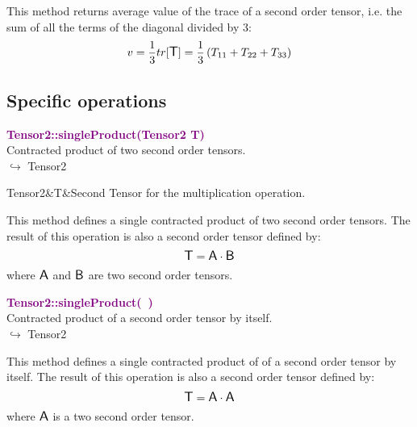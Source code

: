 This method returns average value of the trace of a second order tensor, i.e. the sum of all the terms of the diagonal divided by 3:
\begin{equation*}
v = \frac{1}{3} tr[\mbox{\large\ensuremath{\mathsf{T}}}] =  \frac{1}{3} \left( T_{11}+T_{22}+T_{33} \right)
\end{equation*}

\subsection{Specific operations}

\textcolor{purple}{\textbf{Tensor2::singleProduct(Tensor2 T)}}\label{Tensor2::singleProduct(Tensor2 T)}\\
Contracted product of two second order tensors.\\ \hspace*{10mm}$\hookrightarrow$ Tensor2

\begin{tcolorbox}[width=\textwidth,myArgs,tabularx={ll|R},title=Arguments of Tensor2::singleProduct]
Tensor2&T&Second Tensor for the multiplication operation.
\end{tcolorbox}

This method defines a single contracted product of two second order tensors.
The result of this operation is also a second order tensor defined by:
\begin{equation*}
\mbox{\large\ensuremath{\mathsf{T}}} = \mbox{\large\ensuremath{\mathsf{A}}} \cdot \mbox{\large\ensuremath{\mathsf{B}}}
\end{equation*}
where $\mbox{\large\ensuremath{\mathsf{A}}}$ and $\mbox{\large\ensuremath{\mathsf{B}}}$ are two second order tensors.

\textcolor{purple}{\textbf{Tensor2::singleProduct(~)}}\label{Tensor2::singleProduct()}\\
Contracted product of a second order tensor by itself.\\ \hspace*{10mm}$\hookrightarrow$ Tensor2

This method defines a single contracted product of of a second order tensor by itself.
The result of this operation is also a second order tensor defined by:
\begin{equation*}
\mbox{\large\ensuremath{\mathsf{T}}} = \mbox{\large\ensuremath{\mathsf{A}}} \cdot \mbox{\large\ensuremath{\mathsf{A}}}
\end{equation*}
where $\mbox{\large\ensuremath{\mathsf{A}}}$ is a two second order tensor.

